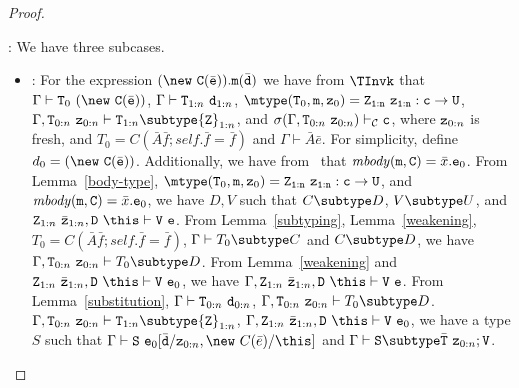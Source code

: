 \begin{proof}
\begin{itemize}
\TInvk: We have three subcases.
   \begin{itemize}
   \item
   \RInvk:  For the expression 
            $(\new\ {\tt C}(\bar{\tt e})).{\tt m}(\bar{\tt d})$
            we have from $\TInvk$ that
            $\Gamma \vdash {\tt T}_0 \ (\new\ {\tt C}(\bar{\tt e}))$,
            $\Gamma \vdash {\tt T}_{1:n} \ {\tt d}_{1:n}$,
            $\mtype({\tt T}_0,{\tt m},{\tt z}_0) = 
               \tt {\tt Z}_{1:n}\ {\tt z}_{1:n}:c \rightarrow {\tt U}$,
            $\Gamma, {\tt T}_{0:n}\ {\tt z}_{0:n} \vdash 
                  {\tt T}_{1:n} \subtype {\tt Z}_{1:n}$, and
            $\sigma(\Gamma, {\tt T}_{0:n}\ {\tt z}_{0:n}) \vdash_{\cal C}                          {\tt c}$, 
            where ${\tt z}_{0:n}$ is fresh, and
            $T_0 = C(\bar{A} \bar{f}; self.\bar{f} = \bar{f})$ and
            $\Gamma \vdash \bar{A} \bar{e}$.
            For simplicity, define $d_0 = (\new\ {\tt C}(\bar{\tt e}))$.
            Additionally, we have from \RInvk\ that
            ${\mathit{mbody}({\tt m},{\tt C})=\bar{x}. {\tt e}_0}$.
            From Lemma~\ref{body-type}, 
            $\mtype({\tt T}_0,{\tt m},{\tt z}_0) =
               \tt {\tt Z}_{1:n}\ {\tt z}_{1:n}:c \rightarrow {\tt U}$, and
            ${\mathit{mbody}({\tt m},{\tt C})=\bar{x}. {\tt e}_0}$,
            we have $D,V$ such that $C \subtype D$, $V \subtype U$, and
            ${\tt Z}_{1:n}\ \bar{\tt z}_{1:n},{\tt D}\ \this \vdash 
                  {\tt V}\ {\tt e}$.
            From Lemma~\ref{subtyping}, Lemma~\ref{weakening},
            $T_0 = C(\bar{A} \bar{f}; self.\bar{f} = \bar{f})$, 
            $\Gamma \vdash T_0 \subtype C$ and
            $C \subtype D$, 
            we have
            $\Gamma, {\tt T}_{0:n}\ {\tt z}_{0:n} \vdash T_0 \subtype D$.
            From Lemma~\ref{weakening} and
            ${\tt Z}_{1:n}\ \bar{\tt z}_{1:n},{\tt D}\ \this \vdash 
                  {\tt V}\ {\tt e}_0$, 
            we have
            $\Gamma, {\tt Z}_{1:n}\ \bar{\tt z}_{1:n},{\tt D}\ \this \vdash 
                  {\tt V}\ {\tt e}$.
            From Lemma~\ref{substitution}, 
            $\Gamma \vdash {\tt T}_{0:n} \ {\tt d}_{0:n}$,
            $\Gamma,{\tt T}_{0:n}\ {\tt z}_{0:n} \vdash T_0 \subtype D$.
            $\Gamma, {\tt T}_{0:n}\ {\tt z}_{0:n} \vdash
                  {\tt T}_{1:n} \subtype {\tt Z}_{1:n}$,
            $\Gamma, {\tt Z}_{1:n}\ \bar{\tt z}_{1:n},{\tt D}\ \this \vdash 
                    {\tt V}\ {\tt e}_0$,
            we have a type $S$ such that 
            $\Gamma \vdash {\tt S}\ 
                 {\tt e}_0[\bar{\tt d}/{\tt z}_{0:n},\new\ C(\bar{e})/\this]$ 
            and
            $\Gamma \vdash {\tt S} \subtype \bar{\tt T}\ {\tt z}_{0:n};{\tt V}$.


\end{itemize}
\end{itemize}
\end{proof}

